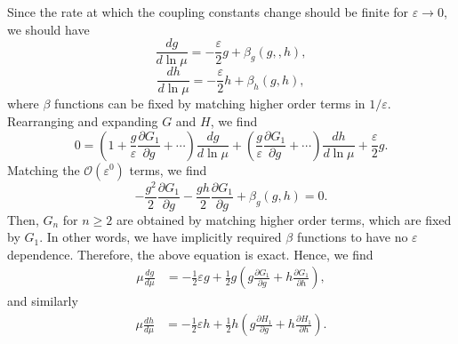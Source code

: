 \begin{enumerate}[label=\alph*)]
\begin{solution}
        Since the rate at which the coupling constants change should be finite for $\varepsilon\to0$, we should have
        \begin{equation}
            \frac{dg}{d\ln\mu} = -\frac{\varepsilon}{2}g + \beta_g(g,,h),
        \end{equation}
        \begin{equation}
            \frac{dh}{d\ln\mu} = -\frac{\varepsilon}{2}h + \beta_h(g,h),
        \end{equation}
        where $\beta$ functions can be fixed by matching higher order terms in $1/\varepsilon$. Rearranging and expanding $G$ and $H$, we find
        \begin{equation}
            0 = \left(1 + \frac{g}{\varepsilon}\frac{\partial G_1}{\partial g} + \cdots\right)\frac{dg}{d\ln\mu} + \left(\frac{g}{\varepsilon}\frac{\partial G_1}{\partial g} + \cdots\right)\frac{dh}{d\ln\mu} + \frac{\varepsilon}{2}g.
        \end{equation}
        Matching the $\mathcal{O}(\varepsilon^0)$ terms, we find
        \begin{equation}
            -\frac{g^2}{2}\frac{\partial G_1}{\partial g} -\frac{gh}{2}\frac{\partial G_1}{\partial g} + \beta_g(g,h) = 0.
        \end{equation}
        Then, $G_n$ for $n\geq2$ are obtained by matching higher order terms, which are fixed by $G_1$. In other words, we have implicitly required $\beta$ functions to have no $\varepsilon$ dependence. Therefore, the above equation is exact. Hence, we find
        \begin{align}
            \mu\frac{dg}{d\mu} &= -\tfrac{1}{2}\varepsilon g + \tfrac{1}{2}g\!\left(g\frac{\partial G_1}{\partial g}+h\frac{\partial G_1}{\partial h}\right),
        \end{align}
        and similarly
        \begin{align}
            \mu\frac{dh}{d\mu} &= -\tfrac{1}{2}\varepsilon h + \tfrac{1}{2}h\!\left(g\frac{\partial H_1}{\partial g}+h\frac{\partial H_1}{\partial h}\right).
        \end{align}
    \end{solution}


\end{enumerate}
